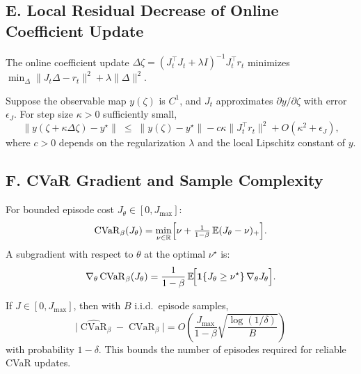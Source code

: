 \subsection*{E. Local Residual Decrease of Online Coefficient Update}

\begin{lemma}
\label{lem:tikhonov}
The online coefficient update
$\Delta\zeta = (J_t^\top J_t + \lambda I)^{-1} J_t^\top r_t$
minimizes $\min_\Delta \|J_t \Delta - r_t\|^2 + \lambda\|\Delta\|^2$.
\end{lemma}

\begin{theorem}
\label{thm:residual_decrease}
Suppose the observable map $y(\zeta)$ is $C^1$, and $J_t$ approximates
$\partial y/\partial\zeta$ with error $\epsilon_J$.
For step size $\kappa > 0$ sufficiently small,
\[
  \|y(\zeta + \kappa\Delta\zeta) - y^\star\|
  \;\leq\;
  \|y(\zeta) - y^\star\| - c\kappa\|J_t^\top r_t\|^2
  + O(\kappa^2 + \epsilon_J),
\]
where $c > 0$ depends on the regularization $\lambda$ and the local
Lipschitz constant of $y$.
\end{theorem}

\subsection*{F. CVaR Gradient and Sample Complexity}

\begin{theorem}
\label{thm:cvar_gradient}
For bounded episode cost $J_\theta \in [0, J_{\max}]$:
\[
  \operatorname{CVaR}_\beta(J_\theta)
  = \min_{\nu \in \mathbb{R}}
    \Bigl[\nu + \tfrac{1}{1-\beta}\,\mathbb{E}(J_\theta - \nu)_+\Bigr].
\]
A subgradient with respect to $\theta$ at the optimal $\nu^\star$ is:
\[
  \nabla_\theta \operatorname{CVaR}_\beta(J_\theta)
  = \frac{1}{1-\beta}\,
    \mathbb{E}\!\Bigl[\mathbf{1}\{J_\theta \geq \nu^\star\}\,
    \nabla_\theta J_\theta \Bigr].
\]
\end{theorem}

\begin{lemma}
\label{lem:cvar_concentration}
If $J \in [0, J_{\max}]$, then with $B$ i.i.d.\ episode samples,
\[
  \bigl|\widehat{\operatorname{CVaR}}_\beta - \operatorname{CVaR}_\beta\bigr|
  = O\!\left(\frac{J_{\max}}{1-\beta}\sqrt{\frac{\log(1/\delta)}{B}}\right)
\]
with probability $1 - \delta$.
This bounds the number of episodes required for reliable CVaR updates.
\end{lemma}

